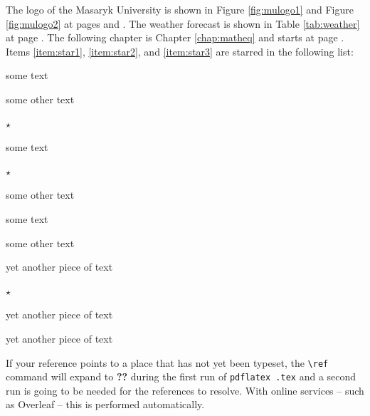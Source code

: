 \documentclass[
  digital,     %
  oneside,     %
  nosansbold,  %
  nocolorbold, %
  lof,         %
  lot,         %
]{fithesis4}
\begin{document}
The logo of the Masaryk University is shown in Figure \ref{fig:mulogo1} and
Figure \ref{fig:mulogo2} at pages \pageref{fig:mulogo1} and
\pageref{fig:mulogo2}. The weather forecast is shown in Table
\ref{tab:weather} at page \pageref{tab:weather}. The following
chapter is Chapter \ref{chap:matheq} and starts at page
\pageref{chap:matheq}.  Items \ref{item:star1}, \ref{item:star2},
and \ref{item:star3} are starred in the following list:
\begin{compactenum}
  \item some text
  \item some other text
  \item $\star$ \label{item:star1}
  \begin{compactenum}
    \item some text
    \item $\star$ \label{item:star2}
    \item some other text
    \begin{compactenum}
      \item some text
      \item some other text
      \item yet another piece of text
      \item $\star$ \label{item:star3}
    \end{compactenum}
    \item yet another piece of text
  \end{compactenum}
  \item yet another piece of text
\end{compactenum}
If your reference points to a place that has not yet been typeset,
the \verb"\ref" command will expand to \textbf{??} during the first
run of
\texttt{pdflatex \jobname.tex}
and a second run is going to be needed for the references to
resolve. With online services -- such as Overleaf -- this is
performed automatically.
\end{document}

